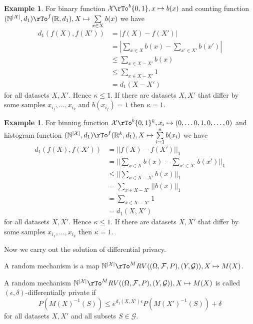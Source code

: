 \documentclass[12pt]{amsart}
\theoremstyle{definition}
\newtheorem{example}[theorem]{Example}
\begin{document}
\begin{example} \label{counting_function_Lipschitz} For binary function $\mathcal{X} \rTo^b \{0, 1\}, x \mapsto b(x)$ and counting function $(\mathbb{N}^{|\mathcal{X}|}, d_1) \rTo^f (\mathbb{R}, d_1), X \mapsto \sum\limits_{x \in X} b(x)$ we have
\begin{align*}
d_1(f(X), f(X')) & = |f(X) - f(X')| \\
 & = |\sum\limits_{x \in X} b(x) - \sum\limits_{x' \in X'} b(x')| \\
 & \leq \sum\limits_{x \in X - X'} b(x) \\
 & \leq \sum\limits_{x \in X - X'} 1 \\
 & = d_1(X - X')
\end{align*}
for all datasets $X, X'$. Hence $\kappa \leq 1$. If there are datasets $X, X'$ that differ by some samples $x_{i_1}, \dots , x_{i_k}$ and $b(x_{i_f}) = 1$ then $\kappa = 1$.
\end{example}

\begin{example} \label{histogram_function_Lipschitz} For binning function $\mathcal{X} \rTo^b \{0, 1\}^k, x_i \mapsto (0, \dots 0, 1, 0, \dots , 0)$ and histogram function $(\mathbb{N}^{|\mathcal{X}|}, d_1) \rTo^f (\mathbb{R}^k, d_1), X \mapsto \sum\limits_{i = 1}^n b(x_i)$ we have
\begin{align*}
d_1(f(X), f(X')) & = ||f(X) - f(X')||_1 \\
 & = ||\sum\limits_{x \in X} b(x) - \sum\limits_{x' \in X'} b(x')||_1 \\
 & \leq ||\sum\limits_{x \in X - X'} b(x)||_1 \\
 & = \sum\limits_{x \in X - X'} ||b(x)||_1 \\
 & = \sum\limits_{x \in X - X'} 1 \\
 & = d_1(X, X')
\end{align*}
for all datasets $X, X'$. Hence $\kappa \leq 1$. If there are datasets $X, X'$ that differ by some samples $x_{i_1}, \dots , x_{i_k}$ then $\kappa = 1$.
\end{example}

Now we carry out the solution of differential privacy.

\dfn \label{random_mechanism} A random mechanism is a map $\mathbb{N}^{|\mathcal{X}|} \rTo^M RV((\Omega, \mathcal{F}, P), (Y, \mathcal{G})), X \mapsto M(X)$.

\dfn \label{epsilon_delta_differential_privacy} A random mechanism $\mathbb{N}^{|\mathcal{X}|} \rTo^M RV((\Omega, \mathcal{F}, P), (Y, \mathcal{G})), X \mapsto M(X)$ is called $(\epsilon, \delta)$-differentially private if 
$$P(M(X)^{-1}(S)) \leq e^{d_1(X, X') \epsilon} P(M(X')^{-1}(S)) + \delta$$
for all datasets $X, X'$ and all subsets $S \in \mathcal{G}$.
\end{document}
